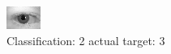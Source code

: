 \begin{figure}[h!]
\begin{center}
\includegraphics[width=0.60\columnwidth]{figures/ID523_class_2_target_3.png}
\end{center}
\caption{ Classification: 2 actual target: 3}
\label{fig:ID523_class_2_target_3}
\end{figure}
